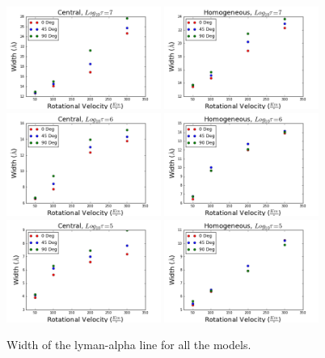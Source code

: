 \documentclass[usenatbib]{mn2e}
\begin{document}
\begin{figure}
    \includegraphics[width=0.45\textwidth]{Width7Central.png}
    \includegraphics[width=0.45\textwidth]{Width7Homogeneous.png}
    \includegraphics[width=0.45\textwidth]{Width6.png}
    \includegraphics[width=0.45\textwidth]{Width6HOM.png}
    \includegraphics[width=0.45\textwidth]{Width5.png}
    \includegraphics[width=0.45\textwidth]{Width5HOM.png}
  \label{figure:width}\caption{Width of the lyman-alpha line for all the models. }
\end{figure}
\end{document}
